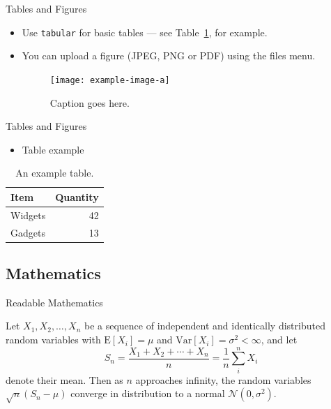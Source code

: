 \documentclass[graphics]{beamer}
\begin{document}
\begin{frame}{Tables and Figures}

\begin{itemize}
\item Use \texttt{tabular} for basic tables --- see Table~\ref{tab:widgets}, for example.
\item You can upload a figure (JPEG, PNG or PDF) using the files menu. 
    \begin{figure}
    \texttt{[image: example-image-a]}
    \caption{\label{fig:your-figure}Caption goes here.}
    \end{figure}


\end{itemize}
\end{frame}


\begin{frame}{Tables and Figures}

\begin{itemize}

\item Table example

\end{itemize}

\begin{table}
\centering
\begin{tabular}{l|r}
Item & Quantity \\\hline
Widgets & 42 \\
Gadgets & 13
\end{tabular}
\caption{\label{tab:widgets}An example table.}
\end{table}

\end{frame}



\subsection{Mathematics}

\begin{frame}{Readable Mathematics}

Let $X_1, X_2, \ldots, X_n$ be a sequence of independent and identically distributed random variables with $\text{E}[X_i] = \mu$ and $\text{Var}[X_i] = \sigma^2 < \infty$, and let
$$S_n = \frac{X_1 + X_2 + \cdots + X_n}{n}
      = \frac{1}{n}\sum_{i}^{n} X_i$$
denote their mean. Then as $n$ approaches infinity, the random variables $\sqrt{n}(S_n - \mu)$ converge in distribution to a normal $\mathcal{N}(0, \sigma^2)$.

\end{frame}
\end{document}
